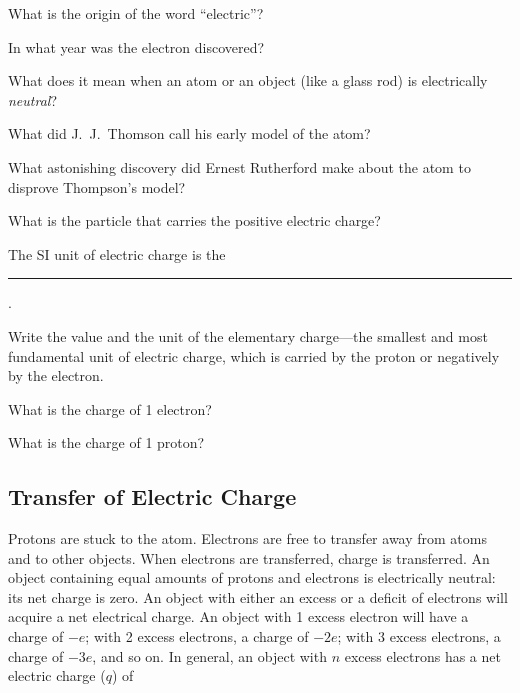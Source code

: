 \documentclass[main.tex]{subfiles}
\begin{document}
\begin{exercise}
    What is the origin of the word ``electric''?
\end{exercise}

\begin{exercise}
    In what year was the electron discovered?
\end{exercise}

\begin{exercise}
    What does it mean when an atom or an object (like a glass rod) is electrically \textit{neutral}?
\end{exercise}

\begin{exercise}
    What did J.~J.~Thomson call his early model of the atom?
\end{exercise}

\begin{exercise}
    What astonishing discovery did Ernest Rutherford make about the atom to disprove Thompson's model?
\end{exercise}

\begin{exercise}
    What is the particle that carries the positive electric charge?
\end{exercise}

\begin{exercise}
    The SI unit of electric charge is the \rule{2cm}{0.15mm}.
\end{exercise}

\begin{exercise}
    Write the value and the unit of the \gls{elementary charge}---the smallest and most fundamental unit of electric charge, which is carried by the proton or negatively by the electron.
\end{exercise}

\begin{exercise}
    What is the charge of 1 electron?
\end{exercise}

\begin{exercise}
    What is the charge of 1 proton?
\end{exercise}

\cyanhrule

\subsection{Transfer of Electric Charge} \label{XFJNUr}

Protons are stuck to the atom. Electrons are free to transfer away from atoms and to other objects. When electrons are transferred, charge is transferred. An object containing equal amounts of protons and electrons is electrically neutral: its net charge is zero. An object with either an excess or a deficit of electrons will acquire a net electrical charge. An object with 1 excess electron will have a charge of $-e$; with 2 excess electrons, a charge of $-2e$; with 3 excess electrons, a charge of $-3e$, and so on. In general, an object with $n$ excess electrons has a net electric charge ($q$) of
\end{document}
